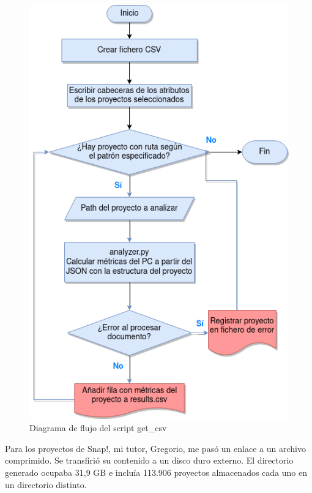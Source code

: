 \documentclass[a4paper, 12pt]{book}
\begin{document}
\begin{figure}[ht]
    \centering
    \includegraphics[height=.6\textheight]{img/script_extraccion_datos.png}
    \caption{Diagrama de flujo del script get\_csv}
    \label{fig:script_extract}
\end{figure}

Para los proyectos de Snap!, mi tutor, Gregorio, me pasó un enlace a un archivo comprimido. Se transfirió su contenido a un disco duro externo. El directorio generado ocupaba 31,9 GB e incluía 113.906 proyectos almacenados cada uno en un directorio distinto.
\end{document}
